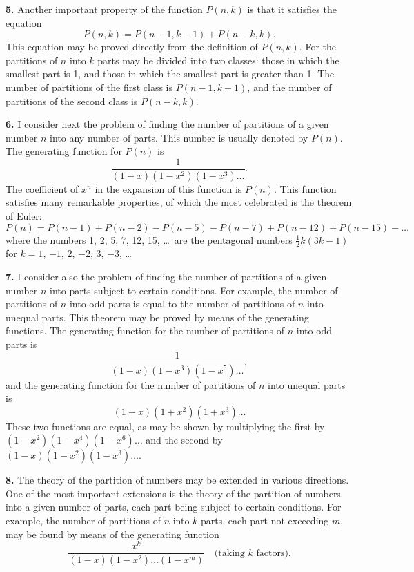 \documentclass[12pt,a4paper]{article}
\begin{document}
\textbf{5.} Another important property of the function $P(n, k)$ is that it satisfies the equation
\[
P(n, k) = P(n-1, k-1) + P(n-k, k).
\]
This equation may be proved directly from the definition of $P(n, k)$. For the partitions of $n$ into $k$ parts may be divided into two classes: those in which the smallest part is 1, and those in which the smallest part is greater than 1. The number of partitions of the first class is $P(n-1, k-1)$, and the number of partitions of the second class is $P(n-k, k)$.

\newpage
\setcounter{page}{236}

\textbf{6.} I consider next the problem of finding the number of partitions of a given number $n$ into any number of parts. This number is usually denoted by $P(n)$. The generating function for $P(n)$ is
\[
\frac{1}{(1-x)(1-x^2)(1-x^3)\ldots}.
\]
The coefficient of $x^n$ in the expansion of this function is $P(n)$. This function satisfies many remarkable properties, of which the most celebrated is the theorem of Euler:
\[
P(n) = P(n-1) + P(n-2) - P(n-5) - P(n-7) + P(n-12) + P(n-15) - \ldots
\]
where the numbers 1, 2, 5, 7, 12, 15, \ldots\ are the pentagonal numbers $\frac{1}{2}k(3k-1)$ for $k = 1$, $-1$, 2, $-2$, 3, $-3$, \ldots

\textbf{7.} I consider also the problem of finding the number of partitions of a given number $n$ into parts subject to certain conditions. For example, the number of partitions of $n$ into odd parts is equal to the number of partitions of $n$ into unequal parts. This theorem may be proved by means of the generating functions. The generating function for the number of partitions of $n$ into odd parts is
\[
\frac{1}{(1-x)(1-x^3)(1-x^5)\ldots},
\]
and the generating function for the number of partitions of $n$ into unequal parts is
\[
(1+x)(1+x^2)(1+x^3)\ldots
\]
These two functions are equal, as may be shown by multiplying the first by $(1-x^2)(1-x^4)(1-x^6)\ldots$ and the second by $(1-x)(1-x^2)(1-x^3)\ldots$.

\newpage
\setcounter{page}{237}

\textbf{8.} The theory of the partition of numbers may be extended in various directions. One of the most important extensions is the theory of the partition of numbers into a given number of parts, each part being subject to certain conditions. For example, the number of partitions of $n$ into $k$ parts, each part not exceeding $m$, may be found by means of the generating function
\[
\frac{x^k}{(1-x)(1-x^2)\ldots(1-x^m)} \quad \text{(taking $k$ factors)}.
\]
\end{document}
